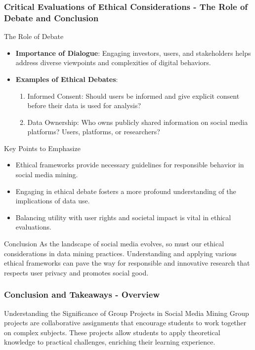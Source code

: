 \documentclass{beamer}
\begin{document}
\begin{frame}[fragile]
    \frametitle{Critical Evaluations of Ethical Considerations - The Role of Debate and Conclusion}
    \begin{block}{The Role of Debate}
        \begin{itemize}
            \item \textbf{Importance of Dialogue}: Engaging investors, users, and stakeholders helps address diverse viewpoints and complexities of digital behaviors.
            \item \textbf{Examples of Ethical Debates}:
                \begin{enumerate}
                    \item Informed Consent: Should users be informed and give explicit consent before their data is used for analysis?
                    \item Data Ownership: Who owns publicly shared information on social media platforms? Users, platforms, or researchers?
                \end{enumerate}
        \end{itemize}
    \end{block}
    
    \begin{block}{Key Points to Emphasize}
        \begin{itemize}
            \item Ethical frameworks provide necessary guidelines for responsible behavior in social media mining.
            \item Engaging in ethical debate fosters a more profound understanding of the implications of data use.
            \item Balancing utility with user rights and societal impact is vital in ethical evaluations.
        \end{itemize}
    \end{block}
    
    \begin{block}{Conclusion}
        As the landscape of social media evolves, so must our ethical considerations in data mining practices. 
        Understanding and applying various ethical frameworks can pave the way for responsible and innovative research that respects user privacy and promotes social good.
    \end{block}
\end{frame}

\begin{frame}[fragile]
    \frametitle{Conclusion and Takeaways - Overview}
    \begin{block}{Understanding the Significance of Group Projects in Social Media Mining}
        Group projects are collaborative assignments that encourage students to work together on complex subjects. 
        These projects allow students to apply theoretical knowledge to practical challenges, enriching their learning experience.
    \end{block}
\end{frame}
\end{document}
